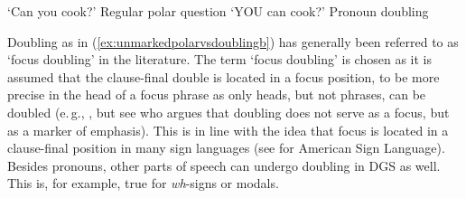 \vspace{-0.2cm}

\begin{exe}
\ex\label{unmarkedpolarvsdoubling}\begin{xlist}
\ex {}
\glt `Can you cook?' \label{ex:unmarkedpolarvsdoublinga}\hfill Regular polar question
\ex {} 
%
%
\glt `YOU can cook?' \label{ex:unmarkedpolarvsdoublingb}\hfill Pronoun doubling

\end{xlist}
\end{exe}

\vspace{-0.2cm}

\noindent Doubling as in (\ref{ex:unmarkedpolarvsdoublingb}) has generally been referred to as `focus doubling' in the literature. The term `focus doubling' is chosen as it is assumed that the clause-final double is located in a focus position, to be more precise in the head of a focus phrase as only heads, but not phrases, can be doubled (e.\,g., \citealt{de1999phrase, sandler2006sign}, but see \citealt{wilbur2012informationstructure} who argues that doubling does not serve as a focus, but as a marker of emphasis). This is in line with the idea that focus is located in a clause-final position in many sign languages (see \citealt{wilbur1991intonation, wilbur1994foregrounding, wilbur1996evidence, wilbur1997prosodic} for American Sign Language). Besides pronouns, other parts of speech can undergo doubling in DGS as well. This is, for example, true for \textit{wh}-signs or modals. 

